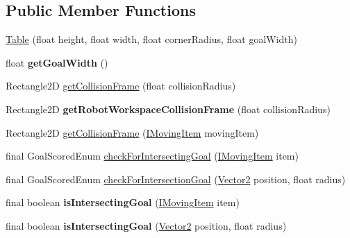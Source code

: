 \subsection*{Public Member Functions}
\begin{DoxyCompactItemize}
\item 
\hyperlink{classairhockeyjava_1_1physical_1_1_table_a09720a86717833f21887ff090a245e91}{Table} (float height, float width, float corner\+Radius, float goal\+Width)
\item 
\hypertarget{classairhockeyjava_1_1physical_1_1_table_a781ef296dfd8ff9480a1282f7dfa8e97}{}float {\bfseries get\+Goal\+Width} ()\label{classairhockeyjava_1_1physical_1_1_table_a781ef296dfd8ff9480a1282f7dfa8e97}

\item 
Rectangle2\+D \hyperlink{classairhockeyjava_1_1physical_1_1_table_a47c055e8011dc881692ff02bd21863e2}{get\+Collision\+Frame} (float collision\+Radius)
\item 
\hypertarget{classairhockeyjava_1_1physical_1_1_table_affecf54224f731d9080a55b433f18d3e}{}Rectangle2\+D {\bfseries get\+Robot\+Workspace\+Collision\+Frame} (float collision\+Radius)\label{classairhockeyjava_1_1physical_1_1_table_affecf54224f731d9080a55b433f18d3e}

\item 
Rectangle2\+D \hyperlink{classairhockeyjava_1_1physical_1_1_table_a94e7ec0bfc2194a6ed7e9951946b8510}{get\+Collision\+Frame} (\hyperlink{interfaceairhockeyjava_1_1physical_1_1_i_moving_item}{I\+Moving\+Item} moving\+Item)
\item 
final Goal\+Scored\+Enum \hyperlink{classairhockeyjava_1_1physical_1_1_table_aabb8796e86a10abd3cf70a3930a3d3c2}{check\+For\+Intersecting\+Goal} (\hyperlink{interfaceairhockeyjava_1_1physical_1_1_i_moving_item}{I\+Moving\+Item} item)
\item 
final Goal\+Scored\+Enum \hyperlink{classairhockeyjava_1_1physical_1_1_table_a744ee5898f24e61dfd73ed85708bbbd3}{check\+For\+Intersection\+Goal} (\hyperlink{classairhockeyjava_1_1util_1_1_vector2}{Vector2} position, float radius)
\item 
\hypertarget{classairhockeyjava_1_1physical_1_1_table_a7c81e3df54b2f2b1245866fb7bbfa3bb}{}final boolean {\bfseries is\+Intersecting\+Goal} (\hyperlink{interfaceairhockeyjava_1_1physical_1_1_i_moving_item}{I\+Moving\+Item} item)\label{classairhockeyjava_1_1physical_1_1_table_a7c81e3df54b2f2b1245866fb7bbfa3bb}

\item 
\hypertarget{classairhockeyjava_1_1physical_1_1_table_ad1f8d91a19729a69cf8374b7154fbadd}{}final boolean {\bfseries is\+Intersecting\+Goal} (\hyperlink{classairhockeyjava_1_1util_1_1_vector2}{Vector2} position, float radius)\label{classairhockeyjava_1_1physical_1_1_table_ad1f8d91a19729a69cf8374b7154fbadd}


\end{DoxyCompactItemize}
